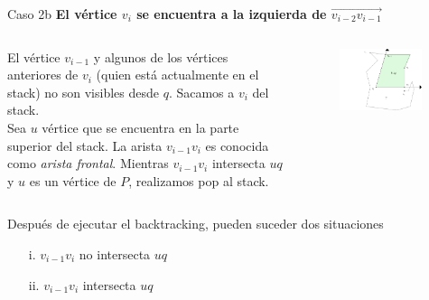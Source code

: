 \documentclass[aspectratio=169,xcolor=dvipsnames, t]{beamer}
\begin{document}
\begin{frame}{Caso 2b}
  \textbf{El vértice $v_{i}$ se encuentra a la izquierda de $\overrightarrow{v_{i-2}v_{i-1}}$}\\
  \vspace{0.5cm}
  \begin{columns}
    \begin{column}{0.45\textwidth}
      \small
      El vértice $v_{i-1}$ y algunos de los vértices anteriores de $v_{i}$ (quien está actualmente en el stack) no son visibles desde $q$. Sacamos a $v_{i}$ del stack. \\
      \vspace{0.5cm}
      Sea $u$ vértice que se encuentra en la parte superior del stack. La arista $v_{i-1}v_{i}$ es conocida como \textit{arista frontal}. Mientras $v_{i-1}v_{i}$ intersecta $uq$ y $u$ es un vértice de $P$, realizamos pop al stack.\\
    \end{column}
    \begin{column}{0.45\textwidth}  %
      \vspace{-1.5cm}
      \begin{figure}
        \centering
        \includegraphics[width=0.95\textwidth]{imagenes/Caso2.4a.png}
      \end{figure}
    \end{column}
  \end{columns}
\end{frame}


\begin{frame}[c]
  Después de ejecutar el backtracking, pueden suceder dos situaciones
  \begin{center}
    \begin{enumerate}
    \item [i.] $v_{i-1}v_{i}$ no intersecta $uq$
    \item [ii.] $v_{i-1}v_{i}$ intersecta $uq$
    \end{enumerate}
  \end{center}
\end{frame}
\end{document}

